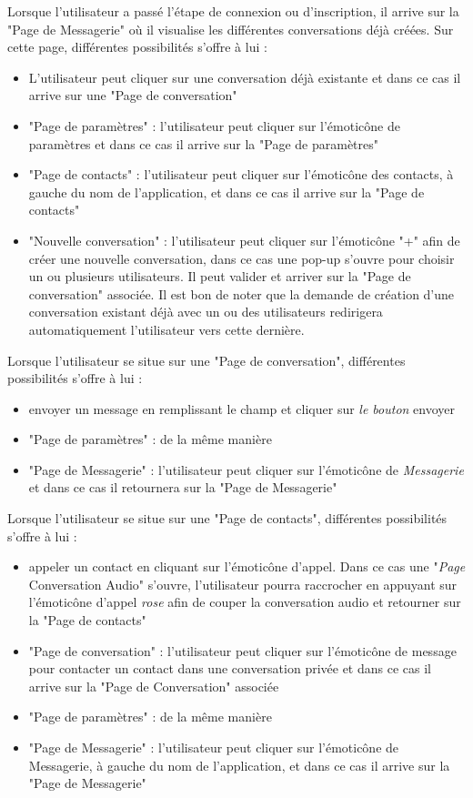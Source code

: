 	Lorsque l'utilisateur a passé l'étape de connexion ou d'inscription, il arrive sur la "Page de Messagerie" où il visualise les différentes conversations déjà créées. Sur cette page, différentes possibilités s'offre à lui :
	\begin{itemize}
		\item L'utilisateur peut cliquer sur une conversation déjà existante et dans ce cas il arrive sur une "Page de conversation"
		\item "Page de paramètres" : l'utilisateur peut cliquer sur l’émoticône de paramètres et dans ce cas il arrive sur la "Page de paramètres"
		\item "Page de contacts" : l'utilisateur peut cliquer sur l’émoticône des contacts, à gauche du nom de l'application, et dans ce cas il arrive sur la "Page de contacts"
		\item "Nouvelle conversation" : l'utilisateur peut cliquer sur l’émoticône "+" afin de créer une nouvelle conversation, dans ce cas une pop-up s'ouvre pour choisir un ou plusieurs utilisateurs.
		Il peut valider et arriver sur la "Page de conversation" associée.
		Il est bon de noter que la demande de création d'une conversation existant déjà avec un ou des utilisateurs redirigera automatiquement l'utilisateur vers cette dernière.\\
	\end{itemize}

	Lorsque l'utilisateur se situe sur une "Page de conversation", différentes possibilités s'offre à lui :
	\begin{itemize}
		\item envoyer un message en remplissant le champ et cliquer sur \textit{le bouton} envoyer
		\item "Page de paramètres" : de la même manière
		\item "Page de Messagerie" : l'utilisateur peut cliquer sur l’émoticône de \textit{Messagerie} et dans ce cas il retournera sur la "Page de Messagerie"\\
	\end{itemize}

	\newpage

	Lorsque l'utilisateur se situe sur une "Page de contacts", différentes possibilités s'offre à lui :
	\begin{itemize}
		\item appeler un contact en cliquant sur l’émoticône d'appel.
		Dans ce cas une "\textit{Page} Conversation Audio" s'ouvre, l'utilisateur pourra raccrocher en appuyant sur l’émoticône d'appel \textit{rose} afin de couper la conversation audio et retourner sur la "Page de contacts"
		\item "Page de conversation" : l'utilisateur peut cliquer sur l’émoticône de message pour contacter un contact dans une conversation privée et dans ce cas il arrive sur la "Page de Conversation" associée
		\item "Page de paramètres" : de la même manière
		\item "Page de Messagerie" : l'utilisateur peut cliquer sur l’émoticône de Messagerie, à gauche du nom de l'application, et dans ce cas il arrive sur la "Page de Messagerie"\\
	\end{itemize}

